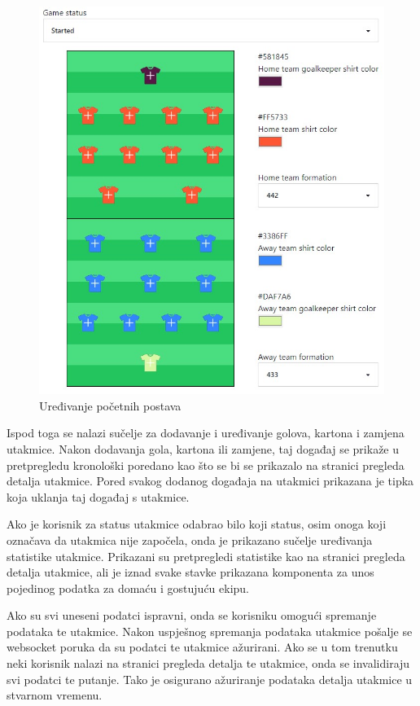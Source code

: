 \documentclass[times, utf8, zavrsni]{fer}
\begin{document}
\begin{figure}[htb]
\centering
\includegraphics[width=12cm]{images/edit-game.jpg}
\caption{Uređivanje početnih postava}
\label{fig:formation}
\end{figure}

Ispod toga se nalazi sučelje za dodavanje i uređivanje golova, kartona i zamjena utakmice.
Nakon dodavanja gola, kartona ili zamjene, taj događaj se prikaže u pretpregledu kronološki poredano kao što se bi se prikazalo na stranici pregleda detalja utakmice.
Pored svakog dodanog događaja na utakmici prikazana je tipka koja uklanja taj događaj s utakmice.

Ako je korisnik za status utakmice odabrao bilo koji status, osim onoga koji označava da utakmica nije započela, onda je prikazano sučelje uređivanja statistike utakmice.
Prikazani su pretpregledi statistike kao na stranici pregleda detalja utakmice, ali je iznad svake stavke prikazana komponenta za unos pojedinog podatka za domaću i gostujuću ekipu.

Ako su svi uneseni podatci ispravni, onda se korisniku omogući spremanje podataka te utakmice. Nakon uspješnog spremanja podataka utakmice pošalje se websocket poruka da su podatci te utakmice ažurirani.
Ako se u tom trenutku neki korisnik nalazi na stranici pregleda detalja te utakmice, onda se invalidiraju svi podatci te putanje. Tako je osigurano ažuriranje podataka detalja utakmice u stvarnom vremenu.
\end{document}
